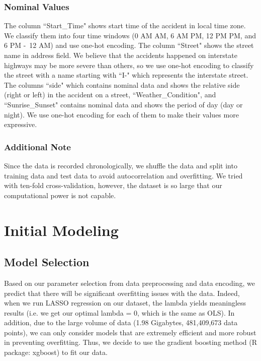 \documentclass[twocolumn]{article}
\begin{document}
\subsubsection{Nominal Values}
The column “Start\_Time" shows start time of the accident in local time zone. We classify them into four time windows (0 AM  AM, 6 AM  PM, 12 PM  PM, and 6 PM -\ 12 AM) and use one-hot encoding. The column “Street" shows the street name in address field. We believe that the accidents happened on interstate highways may be more severe than others, so we use one-hot encoding to classify the street with a name starting  with “I-" which represents the interstate street. The columns “side" which contains nominal data and shows the relative side (right or left) in the accident on a street, “Weather\_Condition", and “Sunrise\_Sunset" contains nominal data and shows the period of day (day or night). We use one-hot encoding for each of them to make their values more expressive.

\subsubsection{Additional Note}
Since the data is recorded chronologically, we shuffle the data and split into training data and test data to avoid autocorrelation and overfitting. We tried with ten-fold cross-validation, however, the dataset is so large that our computational power is not capable. 

\section{Initial Modeling}
\subsection{Model Selection}
Based on our parameter selection from data preprocessing and data encoding, we predict that there will be significant overfitting issues with the data. Indeed, when we run LASSO regression on our dataset, the lambda yields meaningless results (i.e. we get our optimal lambda = 0, which is the same as OLS). In addition, due to the large volume of data (1.98 Gigabytes, 481,409,673 data points), we can only consider models that are extremely efficient and more robust in preventing overfitting. Thus, we decide to use the gradient boosting method (R package: xgboost) to fit our data. 
\end{document}
